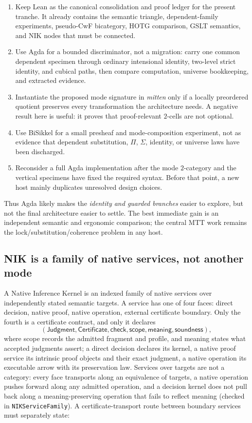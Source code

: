 \documentclass[11pt]{article}
\theoremstyle{definition}
\theoremstyle{remark}
\begin{document}
\begin{enumerate}
\item Keep Lean as the canonical consolidation and proof ledger for the present
  tranche.  It already contains the semantic triangle, dependent-family
  experiments, pseudo-CwF bicategory, HOTG comparison, GSLT semantics, and NIK
  nodes that must be connected.
\item Use Agda for a bounded discriminator, not a migration: carry one common
  dependent specimen through ordinary intensional identity, two-level strict
  identity, and cubical paths, then compare computation, universe bookkeeping,
  and extracted evidence.
\item Instantiate the proposed mode signature in \emph{mitten} only if a
  locally preordered quotient preserves every transformation the architecture
  needs.  A negative result here is useful: it proves that proof-relevant
  $2$-cells are not optional.
\item Use BiSikkel for a small presheaf and mode-composition experiment, not as
  evidence that dependent substitution, $\Pi$, $\Sigma$, identity, or universe
  laws have been discharged.
\item Reconsider a full Agda implementation after the mode $2$-category and the
  vertical specimens have fixed the required syntax.  Before that point, a new
  host mainly duplicates unresolved design choices.
\end{enumerate}

Thus Agda likely makes the \emph{identity and guarded branches} easier to
explore, but not the final architecture easier to settle.  The best immediate
gain is an independent semantic and ergonomic comparison; the central MTT work
remains the lock/substitution/coherence problem in any host.

\subsection{NIK is a family of native services, not another mode}

A Native Inference Kernel is an indexed family of native services over
independently stated semantic targets.  A service has one of four faces:
direct decision, native proof, native operation, external certificate
boundary.  Only the fourth is a certificate contract, and only it declares
\[
  (\mathsf{Judgment},\mathsf{Certificate},\mathsf{check},
   \mathsf{scope},\mathsf{meaning},\mathsf{soundness}),
\]
where scope records the admitted fragment and profile, and meaning states what
accepted judgments assert; a direct decision declares its kernel, a native
proof service its intrinsic proof objects and their exact judgment, a native
operation its executable arrow with its preservation law.  Services over
targets are not a category: every face transports along an equivalence of
targets, a native operation pushes forward along any admitted operation, and
a decision kernel does not pull back along a meaning-preserving operation
that fails to reflect meaning (checked in \texttt{NIKServiceFamily}).  A
certificate-transport route between boundary services must separately state:
\end{document}
